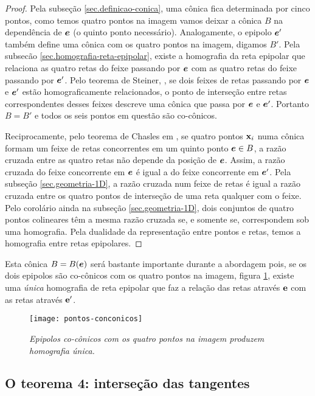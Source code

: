 \begin{proof}
Pela subseção \ref{sec.definicao-conica}, uma cônica fica determinada por cinco pontos, como temos quatro pontos na imagem vamos deixar a cônica $B$ na dependência de $\boldsymbol{e}$ (o quinto ponto necessário). Analogamente, o epipolo $\boldsymbol{e}'$ também define uma cônica com os quatro pontos na imagem, digamos $B'$. Pela subsec\~ao \ref{sec.homografia-reta-epipolar}, existe a homografia da reta epipolar que relaciona as quatro retas do feixe passando por $\boldsymbol{e}$ com as quatro retas do feixe passando por $\boldsymbol{e}'$. Pelo teorema de Steiner, \citep{kneebone}, se dois feixes de retas passando por $\boldsymbol{e}$ e $\boldsymbol{e}'$ estão homograficamente relacionados, o ponto de interseção entre retas correspondentes desses feixes descreve uma cônica que passa por $\boldsymbol{e}$ e $\boldsymbol{e}'$. Portanto $B=B'$ e todos os seis pontos em questão são co-cônicos.


Reciprocamente, pelo teorema de Chasles em \citep{kneebone}, se quatro pontos $\mathbf{x}_i$ numa cônica formam um feixe de retas concorrentes em um quinto ponto $\boldsymbol{e}\in B$, a razão cruzada entre as quatro retas não depende da posição de $\boldsymbol{e}$. Assim, a razão cruzada  do feixe concorrente em $\boldsymbol{e}$ é igual a do feixe concorrente em $\boldsymbol{e}'$. Pela subseção \ref{sec.geometria-1D}, a razão cruzada num feixe de retas é igual a razão cruzada entre os quatro pontos de interseção de uma reta qualquer com o feixe. Pelo corolário ainda na subseção \ref{sec.geometria-1D}, dois conjuntos de quatro pontos colineares têm a mesma razão cruzada se, e somente se, correspondem sob uma homografia.  Pela dualidade da representação entre pontos e retas, temos a homografia entre retas epipolares.  
\end{proof}

Esta cônica $B=B(\boldsymbol{e})$ será bastante importante durante a abordagem pois, se os dois epipolos são co-cônicos com os quatro pontos na imagem, figura \ref{pontos-conconicos}, existe uma \textit{única} homografia de reta epipolar que faz a relação das retas através ${\bf e}$ com as retas através ${\bf e'}$. 

\begin{figure}[!htb]
\centering
\texttt{[image: pontos-conconicos]}
\caption{\textit{Epipolos co-cônicos com os quatro pontos na imagem produzem homografia única.}}
\label{pontos-conconicos}
\end{figure}

\subsection{O teorema 4: interseção das tangentes}\label{sec.demonstracao-teo-4}

